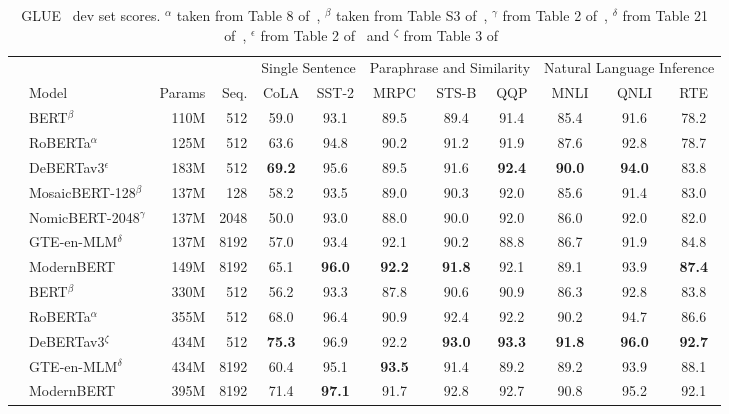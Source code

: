 \documentclass[11pt]{article}
\begin{document}
\begin{table*}[!t]
\small
\centering
\begin{tabular}{llrrcccccccc}
\toprule
& & & & \multicolumn{2}{c}{Single Sentence} & \multicolumn{3}{c}{Paraphrase and Similarity} & \multicolumn{3}{c}{Natural Language Inference} \\
\cmidrule(lr){5-6} \cmidrule(lr){7-9} \cmidrule(lr){10-12}
& Model & Params & Seq. & CoLA & SST-2 & MRPC & STS-B & QQP & MNLI & QNLI & RTE \\
\midrule
\parbox[t]{3mm}{}
& BERT${}^\beta$ & 110M & 512 & 59.0 & 93.1 & 89.5 & 89.4 & 91.4 & 85.4 & 91.6 & 78.2 \\
& RoBERTa${}^\alpha$ & 125M & 512 & 63.6 & 94.8 & 90.2 & 91.2 & 91.9 & 87.6 & 92.8 & 78.7 \\
& DeBERTav3${}^\epsilon$ & 183M & 512 & \textbf{69.2} & 95.6 & 89.5 & 91.6 & \textbf{92.4} & \textbf{90.0} & \textbf{94.0} & 83.8 \\
& MosaicBERT-128${}^\beta$ & 137M & 128 & 58.2 & 93.5 & 89.0 & 90.3 & 92.0 & 85.6 & 91.4 & 83.0 \\
& NomicBERT-2048${}^\gamma$ & 137M & 2048 & 50.0 & 93.0 & 88.0 & 90.0 & 92.0 & 86.0 & 92.0 & 82.0 \\
& GTE-en-MLM${}^\delta$ & 137M & 8192 & 57.0 & 93.4 & 92.1 & 90.2 & 88.8 & 86.7 & 91.9 & 84.8 \\
& ModernBERT & 149M & 8192 & 65.1 & \textbf{96.0} & \textbf{92.2} & \textbf{91.8} & 92.1 & 89.1 & 93.9 & \textbf{87.4} \\
\midrule
\parbox[t]{3mm}{}
& BERT${}^\beta$ & 330M & 512 & 56.2 & 93.3 & 87.8 & 90.6 & 90.9 & 86.3 & 92.8 & 83.8 \\
& RoBERTa${}^\alpha$ & 355M & 512 & 68.0 & 96.4 & 90.9 & 92.4 & 92.2 & 90.2 & 94.7 & 86.6 \\
& DeBERTav3${}^\zeta$ & 434M & 512 & \textbf{75.3} & 96.9 & 92.2 & \textbf{93.0} & \textbf{93.3} & \textbf{91.8} & \textbf{96.0} & \textbf{92.7} \\
& GTE-en-MLM${}^\delta$ & 434M & 8192 & 60.4 & 95.1 & \textbf{93.5} & 91.4 & 89.2 & 89.2 & 93.9 & 88.1 \\
& ModernBERT & 395M & 8192 & 71.4 & \textbf{97.1} & 91.7 & 92.8 & 92.7 & 90.8 & 95.2 & 92.1 \\
\bottomrule
\end{tabular}
\caption{GLUE~\cite{wang-etal-2018-glue} dev set scores. $^\alpha$ taken from Table 8 of~\cite{roberta}, $^\beta$ taken from Table S3 of~\cite{mosaic}, $^\gamma$ from Table 2 of~\cite{nomic}, $^\delta$ from Table 21 of~\cite{gte}, $^\epsilon$ from Table 2 of~\cite{debertabaseresults} and $^\zeta$ from Table 3 of~\cite{debertav3}}
\label{tab:fullglue}
\end{table*}
\end{document}
